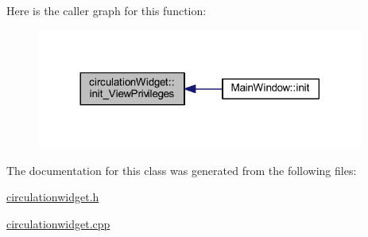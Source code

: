 Here is the caller graph for this function\+:
\nopagebreak
\begin{figure}[H]
\begin{center}
\leavevmode
\includegraphics[width=305pt]{classcirculation_widget_a50b9b9d7491ab6cd379bda38f3eb9930_icgraph}
\end{center}
\end{figure}




The documentation for this class was generated from the following files\+:\begin{DoxyCompactItemize}
\item 
\hyperlink{circulationwidget_8h}{circulationwidget.\+h}\item 
\hyperlink{circulationwidget_8cpp}{circulationwidget.\+cpp}\end{DoxyCompactItemize}
